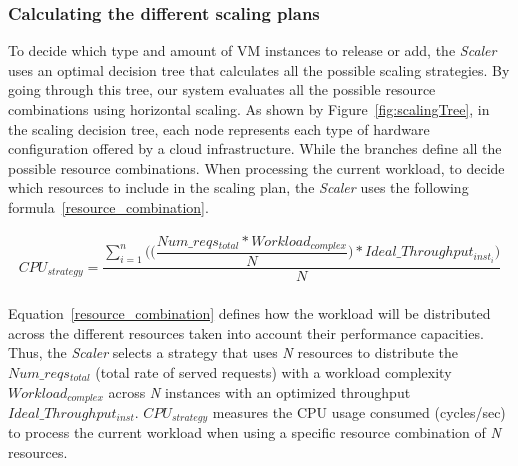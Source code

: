 
\subsubsection{Calculating the different scaling plans}

To decide which type and amount of VM instances to release or add, the \emph{Scaler} uses an optimal decision tree that calculates all the possible scaling strategies. By going through this tree, our system evaluates all the possible resource combinations using horizontal scaling. As shown by Figure~\ref{fig:scalingTree}, in the scaling decision tree, each node represents each type of hardware configuration offered by a cloud infrastructure. While the branches define all the possible resource combinations. When processing the current workload, to decide which resources to include in the scaling plan,  the \emph{Scaler} uses the following formula~\ref{resource_combination}. 



{\scriptsize
\begin{equation}\label{resource_combination}
\begin{split}
CPU_{strategy} = \dfrac{ \sum_{i=1}^n \bigg( \bigg( \dfrac{ Num\_reqs_{total} * Workload_{complex} }  {N}  \bigg) * Ideal\_Throughput_{inst_{i}} \bigg) }  {N} \\ 
\end{split}
\end{equation}
}

Equation~\ref{resource_combination} defines how the workload will be distributed across the different resources taken into account their performance capacities.  Thus, the \emph{Scaler} selects a strategy that uses \emph{N} resources to distribute the \emph{$Num\_reqs_{total}$} (total rate of served requests) with a workload complexity \emph{$Workload_{complex}$} across \emph{N} instances with an optimized throughput \emph{$Ideal\_Throughput_{inst}$}. \emph{$CPU_{strategy}$} measures the CPU usage consumed (cycles/sec) to process the current workload when using a specific resource combination of \emph{N} resources.

